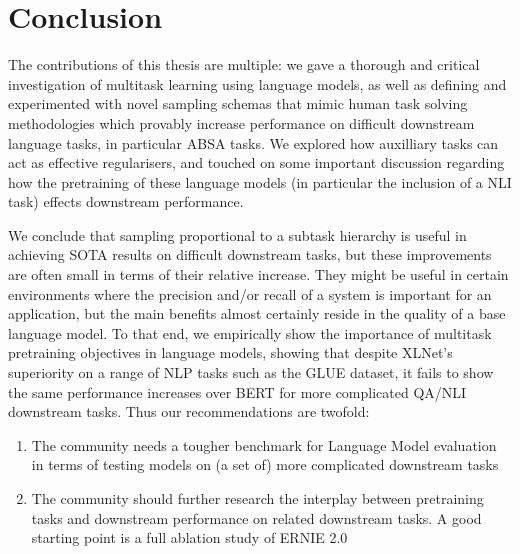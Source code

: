 \documentclass[11pt]{report}
\theoremstyle{Definition}
\theoremstyle{remark}
\begin{document}
\tableofcontents
\newpage \cleardoublepage

\setcounter{page}{1}
\listoftables

\newpage
{} 
\listoffigures


\mbox{}
\printnomenclature
\newpage

 
\newpage \cleardoublepage

 
\newpage \cleardoublepage

 
\newpage \cleardoublepage

 
\newpage \cleardoublepage

 
\newpage \cleardoublepage

\chapter{Conclusion}
The contributions of this thesis are multiple: we gave a thorough and critical investigation of multitask learning using language models, as well as defining and experimented with novel sampling schemas that mimic human task solving methodologies which provably increase performance on difficult downstream language tasks, in particular ABSA tasks. We explored how auxilliary tasks can act as effective regularisers, and touched on some important discussion regarding how the pretraining of these language models (in particular the inclusion of a NLI task) effects downstream performance. 

We conclude that sampling proportional to a subtask hierarchy is useful in achieving SOTA results on difficult downstream tasks, but these improvements are often small in terms of their relative increase. They might be useful in certain environments where the precision and/or recall of a system is important for an application, but the main benefits almost certainly reside in the quality of a base language model. To that end, we empirically show the importance of multitask pretraining objectives in language models, showing that despite XLNet's superiority on a range of NLP tasks such as the GLUE dataset, it fails to show the same performance increases over BERT for more complicated QA/NLI downstream tasks. Thus our recommendations are twofold: 
\begin{enumerate}
	\item The community needs a tougher benchmark for Language Model evaluation in terms of testing models on (a set of) more complicated downstream tasks
	\item The community should further research the interplay between pretraining tasks and downstream performance on related downstream tasks. A good starting point is a full ablation study of ERNIE 2.0 \cite{Sun2019a}
\end{enumerate}
\end{document}
